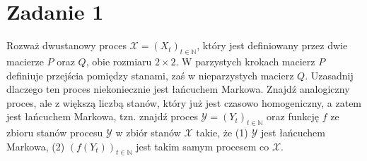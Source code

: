 \section[\nierozwiazane{Zadanie 1}]{Zadanie 1}
Rozważ dwustanowy proces \(\mathcal{X} = (X_t)_{t \in \mathbb{N}}\), który jest definiowany przez
dwie macierze \(P\) oraz \(Q\), obie rozmiaru \(2 \times 2\). W parzystych krokach macierz \(P\) definiuje
przejścia pomiędzy stanami, zaś w nieparzystych macierz \(Q\). Uzasadnij dlaczego ten proces
niekoniecznie jest łańcuchem Markowa. Znajdź analogiczny proces, ale z większą liczbą
stanów, który już jest czasowo homogeniczny, a zatem jest łańcuchem Markowa, tzn.
znajdź proces \(\mathcal{Y} = (Y_t)_{t \in \mathbb{N}}\) oraz funkcję \(f\) ze zbioru stanów procesu \(\mathcal{Y}\) w zbiór stanów \(\mathcal{X}\)
takie, że (1) \(\mathcal{Y}\) jest łańcuchem Markowa, (2) \((f(Y_t))_{t \in \mathbb{N}}\) jest takim samym procesem co \(\mathcal{X}\).

\brakrozwiazania
